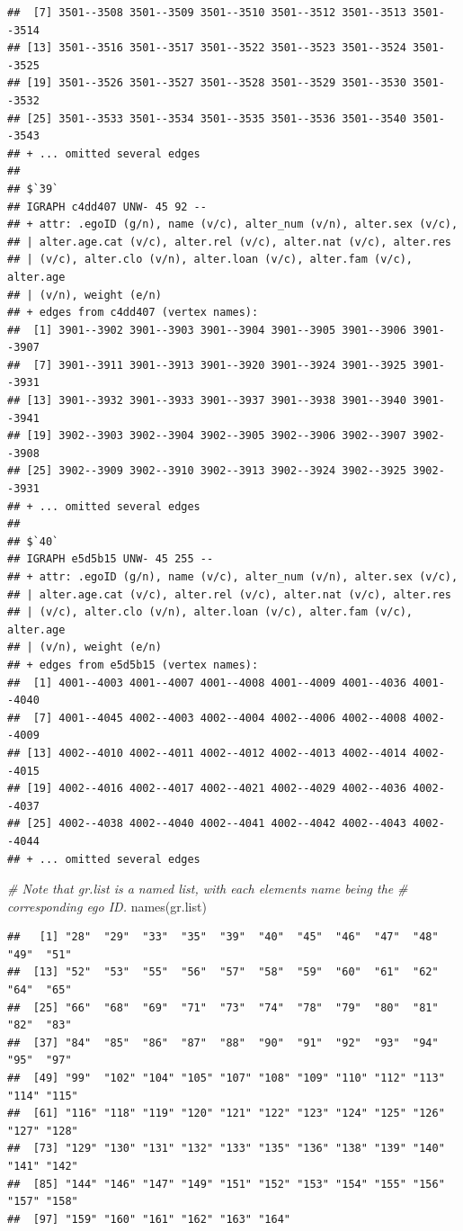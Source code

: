 \documentclass[
]{book}
\newenvironment{Shaded}{\begin{snugshade}}{\end{snugshade}}
\newcommand{\CommentTok}[1]{\textcolor[rgb]{0.56,0.35,0.01}{\textit{#1}}}
\newcommand{\FunctionTok}[1]{\textcolor[rgb]{0.00,0.00,0.00}{#1}}
\newcommand{\NormalTok}[1]{#1}
\begin{document}
\begin{verbatim}
##  [7] 3501--3508 3501--3509 3501--3510 3501--3512 3501--3513 3501--3514
## [13] 3501--3516 3501--3517 3501--3522 3501--3523 3501--3524 3501--3525
## [19] 3501--3526 3501--3527 3501--3528 3501--3529 3501--3530 3501--3532
## [25] 3501--3533 3501--3534 3501--3535 3501--3536 3501--3540 3501--3543
## + ... omitted several edges
## 
## $`39`
## IGRAPH c4dd407 UNW- 45 92 -- 
## + attr: .egoID (g/n), name (v/c), alter_num (v/n), alter.sex (v/c),
## | alter.age.cat (v/c), alter.rel (v/c), alter.nat (v/c), alter.res
## | (v/c), alter.clo (v/n), alter.loan (v/c), alter.fam (v/c), alter.age
## | (v/n), weight (e/n)
## + edges from c4dd407 (vertex names):
##  [1] 3901--3902 3901--3903 3901--3904 3901--3905 3901--3906 3901--3907
##  [7] 3901--3911 3901--3913 3901--3920 3901--3924 3901--3925 3901--3931
## [13] 3901--3932 3901--3933 3901--3937 3901--3938 3901--3940 3901--3941
## [19] 3902--3903 3902--3904 3902--3905 3902--3906 3902--3907 3902--3908
## [25] 3902--3909 3902--3910 3902--3913 3902--3924 3902--3925 3902--3931
## + ... omitted several edges
## 
## $`40`
## IGRAPH e5d5b15 UNW- 45 255 -- 
## + attr: .egoID (g/n), name (v/c), alter_num (v/n), alter.sex (v/c),
## | alter.age.cat (v/c), alter.rel (v/c), alter.nat (v/c), alter.res
## | (v/c), alter.clo (v/n), alter.loan (v/c), alter.fam (v/c), alter.age
## | (v/n), weight (e/n)
## + edges from e5d5b15 (vertex names):
##  [1] 4001--4003 4001--4007 4001--4008 4001--4009 4001--4036 4001--4040
##  [7] 4001--4045 4002--4003 4002--4004 4002--4006 4002--4008 4002--4009
## [13] 4002--4010 4002--4011 4002--4012 4002--4013 4002--4014 4002--4015
## [19] 4002--4016 4002--4017 4002--4021 4002--4029 4002--4036 4002--4037
## [25] 4002--4038 4002--4040 4002--4041 4002--4042 4002--4043 4002--4044
## + ... omitted several edges
\end{verbatim}

\begin{Shaded}
\begin{Highlighting}[]
\CommentTok{\# Note that gr.list is a named list, with each element\textquotesingle{}s name being the }
\CommentTok{\# corresponding ego ID.}
\FunctionTok{names}\NormalTok{(gr.list)}
\end{Highlighting}
\end{Shaded}

\begin{verbatim}
##   [1] "28"  "29"  "33"  "35"  "39"  "40"  "45"  "46"  "47"  "48"  "49"  "51" 
##  [13] "52"  "53"  "55"  "56"  "57"  "58"  "59"  "60"  "61"  "62"  "64"  "65" 
##  [25] "66"  "68"  "69"  "71"  "73"  "74"  "78"  "79"  "80"  "81"  "82"  "83" 
##  [37] "84"  "85"  "86"  "87"  "88"  "90"  "91"  "92"  "93"  "94"  "95"  "97" 
##  [49] "99"  "102" "104" "105" "107" "108" "109" "110" "112" "113" "114" "115"
##  [61] "116" "118" "119" "120" "121" "122" "123" "124" "125" "126" "127" "128"
##  [73] "129" "130" "131" "132" "133" "135" "136" "138" "139" "140" "141" "142"
##  [85] "144" "146" "147" "149" "151" "152" "153" "154" "155" "156" "157" "158"
##  [97] "159" "160" "161" "162" "163" "164"
\end{verbatim}
\end{document}
